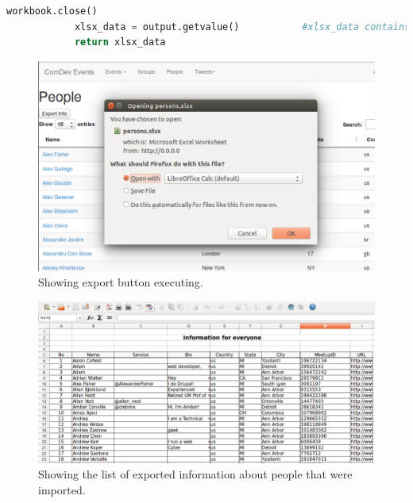 \documentclass[draftclsnofoot,10pt,onecolumn]{IEEEtran} %
\begin{document}
\begin{enumerate}[label*=\arabic*.]
\begin{center}
\begin{lstlisting}[caption=excelutils.py file where the worksheet is generated and exported as an xlsx file, language=Python]
            workbook.close()
            xlsx_data = output.getvalue()           #xlsx_data contains the Excel file
            return xlsx_data
      \end{lstlisting}
    \end{center}
\end{enumerate}


\begin{figure}[H]
  \begin{center}
  \includegraphics[width=5in, frame]{exporting1}
  \captionsetup{width=.4\linewidth}
  \centering
  \caption{Showing export button executing. }

  \end{center}
\end{figure}

\begin{figure}[H]
  \begin{center}
  
  \includegraphics[width=6in, frame]{exporting2}
  \captionsetup{width=.4\linewidth}
  \centering
  \caption{Showing the list of exported information about people that were imported. }

  \end{center}
\end{figure}
\end{document}
